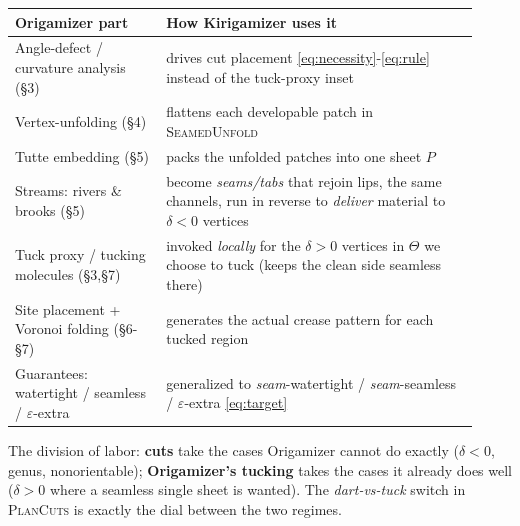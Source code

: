 \documentclass[11pt]{article}
\newcommand{\eps}{\varepsilon}
\newcommand{\defect}{\delta}
\newcommand{\tuckset}{\Theta}
\begin{document}
\begin{center}
\renewcommand{\arraystretch}{1.25}
\begin{tabular}{@{}p{0.30\linewidth}p{0.62\linewidth}@{}}
\toprule
\textbf{Origamizer part} & \textbf{How Kirigamizer uses it} \\
\midrule
Angle-defect / curvature analysis (\S3) & drives cut placement \eqref{eq:necessity}-\eqref{eq:rule} instead of the tuck-proxy inset \\
Vertex-unfolding (\S4) & flattens each developable patch in \textsc{SeamedUnfold} \\
Tutte embedding (\S5) & packs the unfolded patches into one sheet $P$ \\
Streams: rivers \& brooks (\S5) & become \emph{seams/tabs} that rejoin lips, the same channels, run in reverse to \emph{deliver} material to $\defect<0$ vertices \\
Tuck proxy / tucking molecules (\S3,\S7) & invoked \emph{locally} for the $\defect>0$ vertices in $\tuckset$ we choose to tuck (keeps the clean side seamless there) \\
Site placement + Voronoi folding (\S6-\S7) & generates the actual crease pattern for each tucked region \\
Guarantees: watertight / seamless / $\eps$-extra & generalized to \emph{seam}-watertight / \emph{seam}-seamless / $\eps$-extra \eqref{eq:target} \\
\bottomrule
\end{tabular}
\end{center}

\noindent The division of labor: \textbf{cuts} take the cases Origamizer
cannot do exactly ($\defect<0$, genus, nonorientable); \textbf{Origamizer's
tucking} takes the cases it already does well ($\defect>0$ where a seamless
single sheet is wanted). The \emph{dart-vs-tuck} switch in \textsc{PlanCuts}
is exactly the dial between the two regimes.

\end{document}
